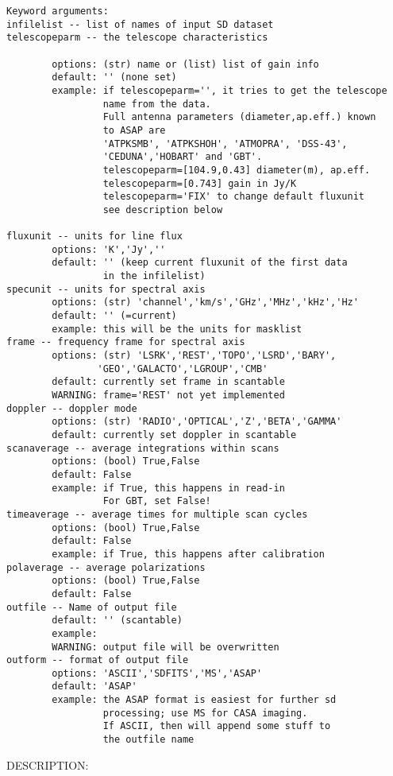 \begin{verbatim}
Keyword arguments:
infilelist -- list of names of input SD dataset
telescopeparm -- the telescope characteristics

        options: (str) name or (list) list of gain info
        default: '' (none set)
        example: if telescopeparm='', it tries to get the telescope
                 name from the data.
                 Full antenna parameters (diameter,ap.eff.) known
                 to ASAP are
                 'ATPKSMB', 'ATPKSHOH', 'ATMOPRA', 'DSS-43',
                 'CEDUNA','HOBART' and 'GBT'.
                 telescopeparm=[104.9,0.43] diameter(m), ap.eff.
                 telescopeparm=[0.743] gain in Jy/K
                 telescopeparm='FIX' to change default fluxunit
                 see description below

fluxunit -- units for line flux
        options: 'K','Jy',''
        default: '' (keep current fluxunit of the first data 
                 in the infilelist)
specunit -- units for spectral axis
        options: (str) 'channel','km/s','GHz','MHz','kHz','Hz'
        default: '' (=current)
        example: this will be the units for masklist
frame -- frequency frame for spectral axis
        options: (str) 'LSRK','REST','TOPO','LSRD','BARY',
                'GEO','GALACTO','LGROUP','CMB'
        default: currently set frame in scantable
        WARNING: frame='REST' not yet implemented
doppler -- doppler mode
        options: (str) 'RADIO','OPTICAL','Z','BETA','GAMMA'
        default: currently set doppler in scantable
scanaverage -- average integrations within scans
        options: (bool) True,False
        default: False
        example: if True, this happens in read-in
                 For GBT, set False!
timeaverage -- average times for multiple scan cycles
        options: (bool) True,False
        default: False
        example: if True, this happens after calibration
polaverage -- average polarizations
        options: (bool) True,False
        default: False
outfile -- Name of output file
        default: '' (scantable)
        example:
        WARNING: output file will be overwritten
outform -- format of output file
        options: 'ASCII','SDFITS','MS','ASAP'
        default: 'ASAP'
        example: the ASAP format is easiest for further sd
                 processing; use MS for CASA imaging.
                 If ASCII, then will append some stuff to
                 the outfile name
\end{verbatim}

          DESCRIPTION:

